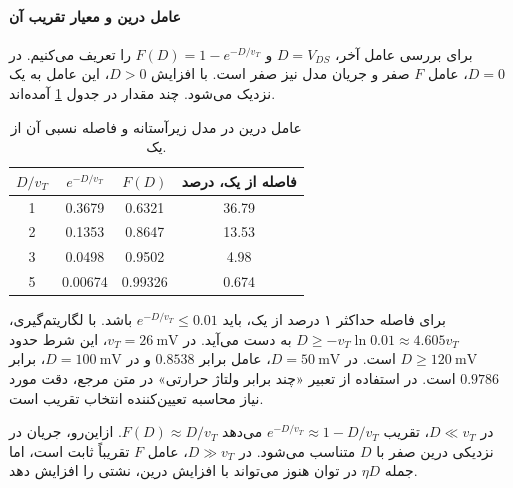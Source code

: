 \paragraph*{عامل درین و معیار تقریب آن}
برای بررسی عامل آخر، \(D=V_{DS}\) و
\(F(D)=1-e^{-D/v_T}\) را تعریف می‌کنیم. در \(D=0\)، عامل \(F\)
صفر و جریان مدل نیز صفر است. با افزایش \(D>0\)، این عامل به یک
نزدیک می‌شود. چند مقدار در جدول \ref{tab:leakage-drain-factor}
آمده‌اند.
\begin{table}[!htbp]
\centering
\small
\caption{عامل درین در مدل زیرآستانه و فاصله نسبی آن از یک.}
\label{tab:leakage-drain-factor}
\begin{tabular}{cccc}
\toprule
\(D/v_T\) & \(e^{-D/v_T}\) & \(F(D)\) & فاصله از یک، درصد\\
\midrule
\num{1} & \num{0.3679} & \num{0.6321} & \num{36.79}\\
\num{2} & \num{0.1353} & \num{0.8647} & \num{13.53}\\
\num{3} & \num{0.0498} & \num{0.9502} & \num{4.98}\\
\num{5} & \num{0.00674} & \num{0.99326} & \num{0.674}\\
\bottomrule
\end{tabular}
\end{table}

برای فاصله حداکثر ۱ درصد از یک، باید
\(e^{-D/v_T}\le0.01\) باشد. با لگاریتم‌گیری،
\(D\ge-v_T\ln0.01\approx4.605v_T\) به دست می‌آید.
در \(v_T=\qty{26}{\milli\volt}\)، این شرط حدود
\(D\ge\qty{120}{\milli\volt}\) است. در
\(D=\qty{50}{\milli\volt}\)، عامل برابر \(0.8538\) و در
\(D=\qty{100}{\milli\volt}\)، برابر \(0.9786\) است.
در استفاده از تعبیر «چند برابر ولتاژ حرارتی» در متن مرجع، دقت مورد
نیاز محاسبه تعیین‌کننده انتخاب تقریب است.

در \(D\ll v_T\)، تقریب \(e^{-D/v_T}\approx1-D/v_T\) می‌دهد
\(F(D)\approx D/v_T\). ازاین‌رو، جریان در نزدیکی درین صفر با
\(D\) متناسب می‌شود. در \(D\gg v_T\)، عامل \(F\) تقریباً ثابت
است، اما جمله \(\eta D\) در توان هنوز می‌تواند با افزایش درین،
نشتی را افزایش دهد.


